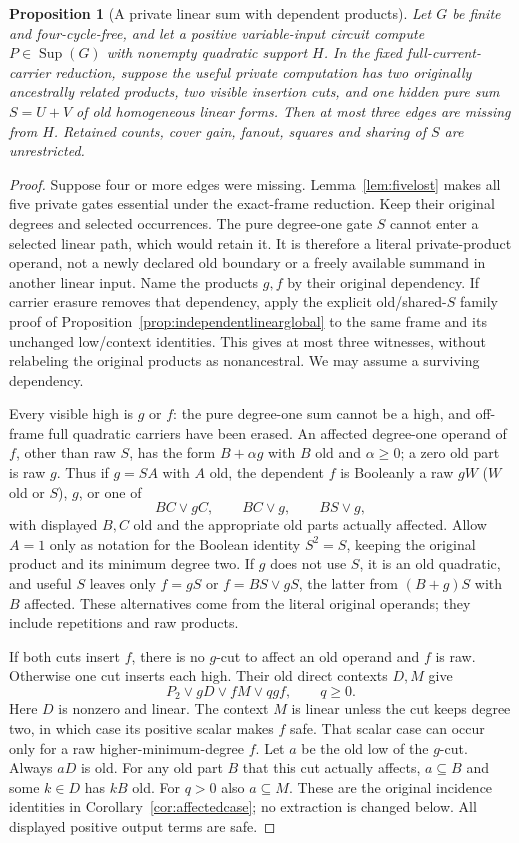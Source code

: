 \documentclass[11pt]{article}
\newcommand{\Sup}{\operatorname{Sup}}
\newtheorem{proposition}[theorem]{Proposition}
\theoremstyle{definition}
\theoremstyle{remark}
\begin{document}
\begin{proposition}[A private linear sum with dependent products]\label{prop:dependentlinearglobal}
Let $G$ be finite and four-cycle-free, and let a positive variable-input
circuit compute $P\in\Sup(G)$ with nonempty quadratic support $H$.
In the fixed full-current-carrier reduction, suppose the useful private
computation has two originally ancestrally related products, two visible
insertion cuts, and one hidden pure sum $S=U+V$ of old homogeneous linear
forms. Then at most three edges are missing from $H$. Retained counts,
cover gain, fanout, squares and sharing of $S$ are unrestricted.
\end{proposition}
\begin{proof}
Suppose four or more edges were missing. Lemma~\ref{lem:fivelost}
makes all five private gates essential under the exact-frame reduction.
Keep their original degrees and selected occurrences. The pure degree-one
gate $S$ cannot enter a selected linear path, which would retain it.
It is therefore a literal private-product operand, not a newly declared
old boundary or a freely available summand in another linear input.
Name the products $g,f$ by their original dependency. If carrier erasure
removes that dependency, apply the explicit old/shared-$S$ family proof of
Proposition~\ref{prop:independentlinearglobal} to the same frame and its
unchanged low/context identities. This gives at most three witnesses,
without relabeling the original products as nonancestral. We may assume a
surviving dependency.

Every visible high is $g$ or $f$: the pure degree-one sum cannot be a high,
and off-frame full quadratic carriers have been erased. An affected
degree-one operand of $f$, other than raw $S$, has the form $B+\alpha g$
with $B$ old and $\alpha\ge0$; a zero old part is raw $g$.
Thus if $g=SA$ with $A$ old, the dependent $f$ is Booleanly a raw
$gW$ ($W$ old or $S$), $g$, or one of
\[
 BC\vee gC,\qquad BC\vee g,\qquad BS\vee g,
\]
with displayed $B,C$ old and the appropriate old parts actually affected.
Allow $A=1$ only as notation for the Boolean identity $S^2=S$, keeping
the original product and its minimum degree two. If $g$ does not use $S$,
it is an old quadratic, and useful $S$ leaves only
$f=gS$ or $f=BS\vee gS$, the latter from $(B+g)S$ with $B$ affected.
These alternatives come from the literal original operands; they include
repetitions and raw products.

If both cuts insert $f$, there is no $g$-cut to affect an old operand and
$f$ is raw. Otherwise one cut inserts each high. Their old direct contexts
$D,M$ give
\[
 P_2\vee gD\vee fM\vee qgf,\qquad q\ge0.                 \tag{*}
\]
Here $D$ is nonzero and linear. The context $M$ is linear unless the cut
keeps degree two, in which case its positive scalar makes $f$ safe.
That scalar case can occur only for a raw higher-minimum-degree $f$.
Let $a$ be the old low of the $g$-cut. Always $aD$ is old. For any old
part $B$ that this cut actually affects, $a\subseteq B$ and some
$k\in D$ has $kB$ old. For $q>0$ also $a\subseteq M$.
These are the original incidence identities in
Corollary~\ref{cor:affectedcase}; no extraction is changed below.
All displayed positive output terms are safe.


\end{proof}
\end{document}
